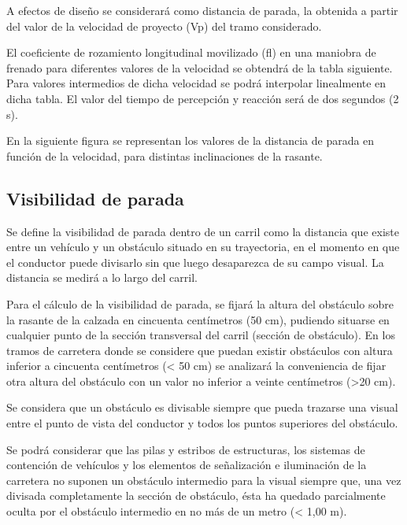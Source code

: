 \documentclass[letterpaper,10pt,english]{sphinxmanual}
\let\sphinxpxdimen\pdfpxdimen\else\newdimen\sphinxpxdimen
\begin{document}
A efectos de diseño se considerará como distancia de parada, la obtenida a partir del valor de la velocidad de proyecto (Vp) del tramo considerado.

El coeficiente de rozamiento longitudinal movilizado (fl) en una maniobra de frenado para diferentes valores de la velocidad se obtendrá de la tabla siguiente. Para valores intermedios de dicha velocidad se podrá interpolar linealmente en dicha tabla. El valor del tiempo de percepción y reacción será de dos segundos (2 s).

\noindent\sphinxincludegraphics[width=800\sphinxpxdimen]{{coefroz}.png}

En la siguiente figura se representan los valores de la distancia de parada en función de la velocidad, para distintas inclinaciones de la rasante.

\noindent\sphinxincludegraphics[width=800\sphinxpxdimen]{{distparada}.png}


\subsection{Visibilidad de parada}
\label{\detokenize{controles:visibilidad-de-parada}}
Se define la visibilidad de parada dentro de un carril como la distancia que existe entre un vehículo y un obstáculo situado en su trayectoria, en el momento en que el conductor puede divisarlo sin que luego desaparezca de su campo visual. La distancia se medirá a lo largo del carril.

Para el cálculo de la visibilidad de parada, se fijará la altura del obstáculo sobre la rasante de la calzada en cincuenta centímetros (50 cm), pudiendo situarse en cualquier punto de la sección transversal del carril (sección de obstáculo). En los tramos de carretera donde se considere que puedan existir obstáculos con altura inferior a cincuenta centímetros (\textless{} 50 cm) se analizará la conveniencia de fijar otra altura del obstáculo con un valor no inferior a veinte centímetros (\textgreater{}20 cm).

Se considera que un obstáculo es divisable siempre que pueda trazarse una visual entre el punto de vista del conductor y todos los puntos superiores del obstáculo.

Se podrá considerar que las pilas y estribos de estructuras, los sistemas de contención de vehículos y los elementos de señalización e iluminación de la carretera no suponen un obstáculo intermedio para la visual siempre que, una vez divisada completamente la sección de obstáculo, ésta ha quedado parcialmente oculta por el obstáculo intermedio en no más de un metro (\textless{} 1,00 m).
\end{document}
